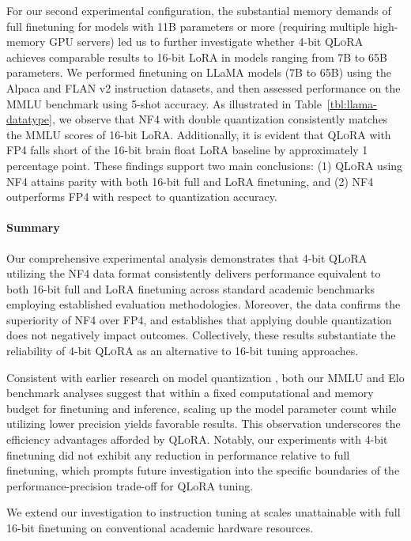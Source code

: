 For our second experimental configuration, the substantial memory demands of full finetuning for models with 11B parameters or more (requiring multiple high-memory GPU servers) led us to further investigate whether 4-bit \textsc{QLoRA} achieves comparable results to 16-bit LoRA in models ranging from 7B to 65B parameters. We performed finetuning on LLaMA models (7B to 65B) using the Alpaca and FLAN v2 instruction datasets, and then assessed performance on the MMLU benchmark using 5-shot accuracy. As illustrated in Table~\ref{tbl:llama-datatype}, we observe that NF4 with double quantization consistently matches the MMLU scores of 16-bit LoRA. Additionally, it is evident that \textsc{QLoRA} with FP4 falls short of the 16-bit brain float LoRA baseline by approximately 1 percentage point. These findings support two main conclusions: (1) \textsc{QLoRA} using NF4 attains parity with both 16-bit full and LoRA finetuning, and (2) NF4 outperforms FP4 with respect to quantization accuracy.

\paragraph{Summary} Our comprehensive experimental analysis demonstrates that 4-bit \textsc{QLoRA} utilizing the NF4 data format consistently delivers performance equivalent to both 16-bit full and LoRA finetuning across standard academic benchmarks employing established evaluation methodologies. Moreover, the data confirms the superiority of NF4 over FP4, and establishes that applying double quantization does not negatively impact outcomes. Collectively, these results substantiate the reliability of 4-bit \textsc{QLoRA} as an alternative to 16-bit tuning approaches.

Consistent with earlier research on model quantization \citep{dettmers2022case}, both our MMLU and Elo benchmark analyses suggest that within a fixed computational and memory budget for finetuning and inference, scaling up the model parameter count while utilizing lower precision yields favorable results. This observation underscores the efficiency advantages afforded by \textsc{QLoRA}. Notably, our experiments with 4-bit finetuning did not exhibit any reduction in performance relative to full finetuning, which prompts future investigation into the specific boundaries of the performance-precision trade-off for QLoRA tuning.

We extend our investigation to instruction tuning at scales unattainable with full 16-bit finetuning on conventional academic hardware resources.

